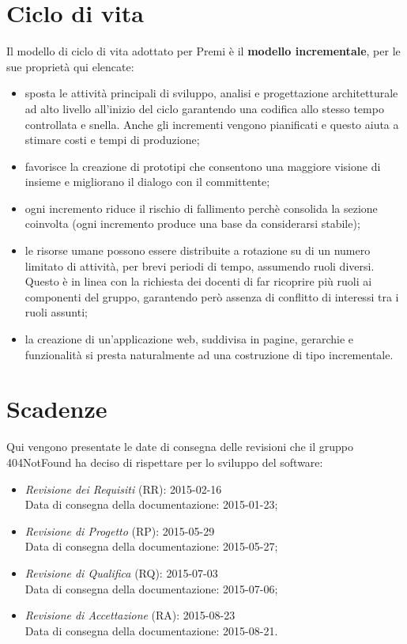 \newpage
\section{Ciclo di vita}
Il modello di ciclo di vita adottato per Premi è il \textbf{modello incrementale}, per le sue proprietà qui elencate:

\begin{itemize}
	\item sposta le attività principali di sviluppo, analisi e progettazione architetturale ad alto livello all'inizio del ciclo garantendo una codifica allo stesso tempo controllata e snella. Anche gli incrementi vengono pianificati e questo aiuta a stimare costi e tempi di produzione;
	\item favorisce la creazione di prototipi che consentono una maggiore visione di insieme e migliorano il dialogo con il committente;
	\item ogni incremento riduce il rischio di fallimento perchè consolida la sezione coinvolta (ogni incremento produce una base da considerarsi stabile);
	\item le risorse umane possono essere distribuite a rotazione su di un numero limitato di attività, per brevi periodi di tempo, assumendo ruoli diversi. Questo è in linea con la richiesta dei docenti di far ricoprire più ruoli ai componenti del gruppo, garantendo però assenza di conflitto di interessi tra i ruoli assunti;
	\item la creazione di un'applicazione web, suddivisa in pagine, gerarchie e funzionalità si presta naturalmente ad una costruzione di tipo incrementale.
\end{itemize}	

\section{Scadenze}
Qui vengono presentate le date di consegna delle revisioni che il gruppo 404NotFound ha deciso di rispettare per lo sviluppo del software:

\begin{itemize}
	\item \textit{Revisione dei Requisiti} (RR): 2015-02-16 \\
	Data di consegna della documentazione: 2015-01-23;
	\item \textit{Revisione di Progetto} (RP): 2015-05-29 \\
	Data di consegna della documentazione: 2015-05-27;
	\item \textit{Revisione di Qualifica} (RQ): 2015-07-03 \\
	Data di consegna della documentazione: 2015-07-06;
	\item \textit{Revisione di Accettazione} (RA): 2015-08-23 \\
	Data di consegna della documentazione: 2015-08-21.
\end{itemize}
